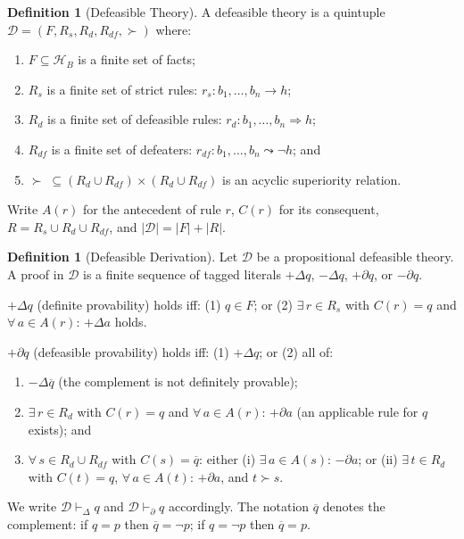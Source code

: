 \documentclass{article}
\theoremstyle{definition}
\newtheorem{definition}[theorem]{Definition}
\newcommand{\D}{\mathcal{D}}
\newcommand{\HB}{\mathcal{H}_B}
\newcommand{\Rs}{R_s}
\newcommand{\Rd}{R_d}
\newcommand{\Rdf}{R_{df}}
\newcommand{\pDelta}{\vdash_{\Delta}}
\newcommand{\pPartial}{\vdash_{\partial}}
\newcommand{\defto}{\Rightarrow}
\newcommand{\strictto}{\rightarrow}
\newcommand{\defeatto}{\leadsto}
\newcommand{\comp}[1]{\overline{#1}}
\begin{document}
\begin{definition}[Defeasible Theory]\label{def:deftheory}
A defeasible theory is a quintuple $\D = (F, \Rs, \Rd, \Rdf, {\succ})$ where:
\begin{enumerate}[label=(\roman*)]
    \item $F \subseteq \HB$ is a finite set of facts;
    \item $\Rs$ is a finite set of strict rules: $r_s\colon b_1, \ldots, b_n \strictto h$;
    \item $\Rd$ is a finite set of defeasible rules: $r_d\colon b_1, \ldots, b_n \defto h$;
    \item $\Rdf$ is a finite set of defeaters: $r_{df}\colon b_1, \ldots, b_n \defeatto \neg h$; and
    \item ${\succ} \;\subseteq (\Rd \cup \Rdf) \times (\Rd \cup \Rdf)$ is an acyclic superiority relation.
\end{enumerate}
Write $A(r)$ for the antecedent of rule $r$, $C(r)$ for its consequent, $R = \Rs \cup \Rd \cup \Rdf$, and $|\D| = |F| + |R|$.
\end{definition}

\begin{definition}[Defeasible Derivation]\label{def:defderiv}
Let $\D$ be a propositional defeasible theory. A proof in $\D$ is a finite sequence of tagged literals $+\Delta q$, $-\Delta q$, $+\partial q$, or $-\partial q$.

$+\Delta q$ (definite provability) holds iff: (1) $q \in F$; or (2) $\exists\, r \in \Rs$ with $C(r) = q$ and $\forall\, a \in A(r)$: $+\Delta a$ holds.

$+\partial q$ (defeasible provability) holds iff: (1) $+\Delta q$; or (2) all of:
\begin{enumerate}[label=(\alph*)]
    \item $-\Delta \comp{q}$ (the complement is not definitely provable);
    \item $\exists\, r \in \Rd$ with $C(r) = q$ and $\forall\, a \in A(r)$: $+\partial a$ (an applicable rule for $q$ exists); and
    \item $\forall\, s \in \Rd \cup \Rdf$ with $C(s) = \comp{q}$: either
        (i) $\exists\, a \in A(s)$: $-\partial a$; or
        (ii) $\exists\, t \in \Rd$ with $C(t) = q$, $\forall\, a \in A(t)$: $+\partial a$, and $t \succ s$.
\end{enumerate}
We write $\D \pDelta q$ and $\D \pPartial q$ accordingly. The notation $\comp{q}$ denotes the complement: if $q = p$ then $\comp{q} = \neg p$; if $q = \neg p$ then $\comp{q} = p$.
\end{definition}
\end{document}
